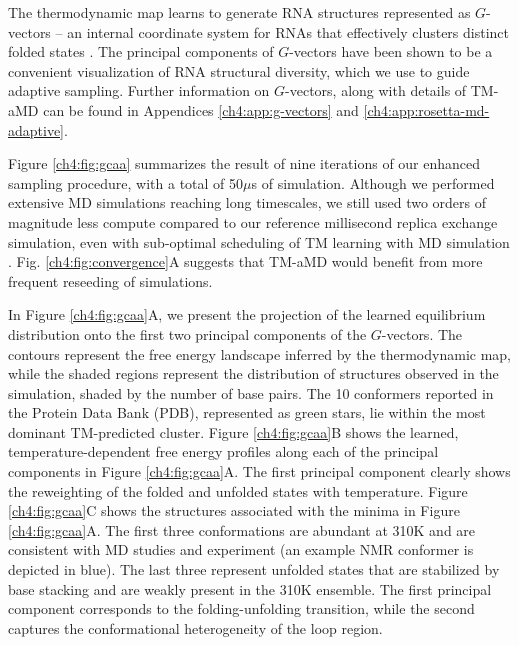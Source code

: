 The thermodynamic map learns to generate RNA structures represented as $G$-vectors -- an internal coordinate system for RNAs that effectively clusters distinct folded states \cite{gvecs-bussi}. The principal components of $G$-vectors have been shown to be a convenient visualization of RNA structural diversity, which we use to guide adaptive sampling. Further information on $G$-vectors, along with details of TM-aMD can be found in Appendices \ref{ch4:app:g-vectors} and \ref{ch4:app:rosetta-md-adaptive}.

Figure \ref{ch4:fig:gcaa} summarizes the result of nine iterations of our enhanced sampling procedure, with a total of 50$\mu$s of simulation. Although we performed extensive MD simulations reaching long timescales, we still used two orders of magnitude less compute compared to our reference millisecond replica exchange simulation, even with sub-optimal scheduling of TM learning with MD simulation  \cite{DE-Shaw-RNA-ff}. Fig. \ref{ch4:fig:convergence}A suggests that TM-aMD would benefit from more frequent reseeding of simulations.

In Figure \ref{ch4:fig:gcaa}A, we present the projection of the learned equilibrium distribution onto the first two principal components of the $G$-vectors. The contours represent the free energy landscape inferred by the thermodynamic map, while the shaded regions represent the distribution of structures observed in the simulation, shaded by the number of base pairs. The 10 conformers reported in the Protein Data Bank (PDB), represented as green stars, lie within the most dominant TM-predicted cluster. Figure \ref{ch4:fig:gcaa}B shows the learned, temperature-dependent free energy profiles along each of the principal components in Figure \ref{ch4:fig:gcaa}A. The first principal component clearly shows the reweighting of the folded and unfolded states with temperature. Figure \ref{ch4:fig:gcaa}C shows the structures associated with the minima in Figure \ref{ch4:fig:gcaa}A. The first three conformations are abundant at 310K and are consistent with MD studies \cite{DE-Shaw-RNA-ff,debenedetti-rna} and experiment (an example NMR conformer is depicted in blue). The last three represent unfolded states that are stabilized by base stacking and are weakly present in the 310K ensemble. The first principal component corresponds to the folding-unfolding transition, while the second captures the conformational heterogeneity of the loop region.

